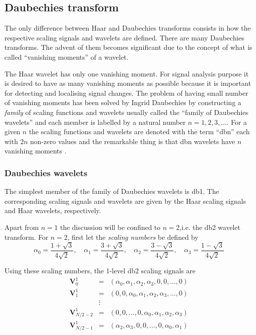 \documentclass[a4paper,11pt]{report}
\begin{document}
\subsection{Daubechies transform} 
The only difference between Haar and Daubechies transforms consists in how the respective scaling signals and wavelets are defined. There are many Daubechies transforms. The advent of them becomes significant due to the concept of what is called ``vanishing moments'' of a wavelet.

The Haar wavelet has only one vanishing moment. For signal analysis purpose it is desired to have as many vanishing moments as possible because it is important for detecting and localising signal changes. The problem of having small number of vanishing moments has been solved by Ingrid Daubechies by constructing a \emph{family} of scaling functions and wavelets usually called the ``family of Daubechies wavelets'' and each member is labelled by a natural number $n=1,2,3,\ldots$. For a given $n$ the scaling functions and wavelets are denoted with the term ``dbn'' each with $2n$ non-zero values and the remarkable thing is that dbn wavelets have $n$ vanishing moments \cite{stark}.

\subsubsection{Daubechies wavelets}
The simplest member of the family of Daubechies wavelets is db1. The corresponding scaling signals and wavelets are given by the Haar scaling signals and Haar wavelets, respectively.

Apart from $n=1$ the discussion will be confined to $n=2$,i.e. the db2 wavelet transform. For $n=2$, first let the \emph{scaling numbers} be defined by
\begin{equation}
\alpha_{0}=\frac{1+\sqrt{3}}{4\sqrt{2}}, \quad \alpha_{1}=\frac{3+\sqrt{3}}{4\sqrt{2}}, \quad \alpha_{2}=\frac{3-\sqrt{3}}{4\sqrt{2}}, \quad \alpha_{3}=\frac{1-\sqrt{3}}{4\sqrt{2}}
\end{equation}

Using these scaling numbers, the 1-level db2 scaling signals are
\begin{eqnarray}
\mathbf{V}_{0}^{1} & = & ( \alpha_{0},\alpha_{1},\alpha_{2},\alpha_{3},0,0,\ldots,0 ) \nonumber \\
\mathbf{V}_{1}^{1} & = & ( 0,0,\alpha_{0},\alpha_{1},\alpha_{2},\alpha_{3},\ldots,0 ) \nonumber \\
	 & \vdots & 	\nonumber \\
\mathbf{V}_{N/2-2}^{1} & = & ( 0,0,\ldots,0,\alpha_{0},\alpha_{1},\alpha_{2},\alpha_{3} ) \nonumber \\ 
\mathbf{V}_{N/2-1}^{1} & = & ( \alpha_{2},\alpha_{3},0,0,\ldots,0,\alpha_{0},\alpha_{1} )  
\end{eqnarray}
\end{document}
